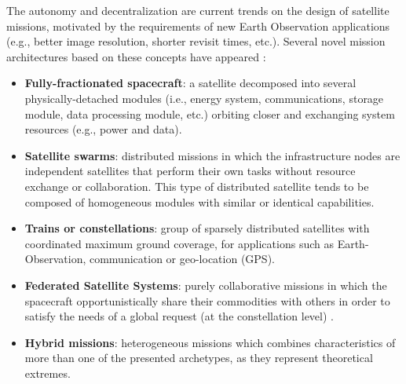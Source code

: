 
The autonomy and decentralization are current trends on the design of satellite missions, motivated by the requirements of new Earth Observation applications (e.g., better image resolution, shorter revisit times, etc.). Several novel mission architectures based on these concepts have appeared \citep{Araguz15,d2012distributed}:
\begin{itemize}

\item \textbf{Fully-fractionated spacecraft}: a satellite decomposed into several physically-detached modules (i.e., energy system, communications, storage module, data processing module, etc.) orbiting closer and exchanging system resources (e.g., power and data).

\item \textbf{Satellite swarms}: distributed missions in which the infrastructure nodes are independent satellites that perform their own tasks without resource exchange or collaboration. This type of distributed satellite tends to be composed of homogeneous modules with similar or identical capabilities.

\item \textbf{Trains or constellations}: group of sparsely distributed satellites with coordinated maximum ground coverage, for applications such as Earth-Observation, communication or geo-location (GPS).

\item \textbf{Federated Satellite Systems}: purely collaborative missions in which the spacecraft opportunistically share their commodities with others in order to satisfy the needs of a global request (at the constellation level) \cite{golkar2013federated}.

\item \textbf{Hybrid missions}: heterogeneous missions which combines characteristics of more than one of the presented archetypes, as they represent theoretical extremes.

\end{itemize}

